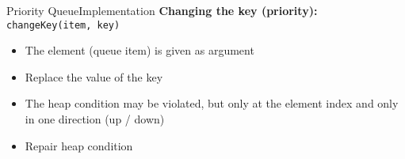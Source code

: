 \begin{frame}{Priority Queue}{Implementation}
  \textbf{Changing the key (priority):}
  {\color{Mittel-Blau}\texttt{changeKey(item, key)}}
  \begin{itemize}
    \item
      The element (queue item) is given as argument
    \item
      Replace the value of the key
    \item
      The {\color{Mittel-Blau}heap condition} may be violated, but only at the
      element index and only in one direction (up / down)
    \item
      Repair {\color{Mittel-Blau}heap condition}
  \end{itemize}
    \begin{figure}[!h]
      \begin{adjustbox}{height=0.275\linewidth}
      \end{adjustbox}
      \hspace{0.25em}\hspace{-1.5em}
      \begin{adjustbox}{height=0.275\linewidth}
      \end{adjustbox}
      \label{fig:priority_queue:impl_change_key}%
    \end{figure}%
\end{frame}


